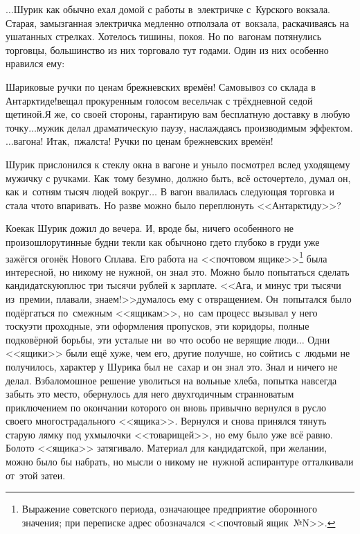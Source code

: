{%
	$\ldots$Шурик как обычно ехал домой с работы в~электричке с~Курского вокзала. Старая, замызганная электричка медленно отползала от~вокзала, раскачиваясь на ушатанных стрелках. Хотелось тишины, покоя. Но по~вагонам потянулись торговцы, большинство из них торговало тут годами. Один из них особенно нравился ему:
	
	\diagdash Шариковые ручки по ценам брежневских времён! Самовывоз со склада в Антарктиде!\mdash вещал прокуренным голосом весельчак с трёхдневной седой щетиной.\mdash Я же, со своей стороны, гарантирую вам бесплатную доставку в любую точку$\ldots$\mdash мужик делал драматическую паузу, наслаждаясь производимым эффектом.\mdash $\ldots$вагона! Итак,~пжалста! Ручки по ценам брежневских времён!%
	
	Шурик прислонился к стеклу окна в вагоне и уныло посмотрел вслед уходящему мужичку с ручками. Как~тому безумно, должно быть, всё осточертело, думал он, как и~сотням тысяч людей вокруг$\ldots$ В вагон ввалилась следующая торговка и стала что\sdash то впаривать. Но разве можно было переплюнуть <<Антарктиду>>? 
	
	Кое\sdash как Шурик дожил до вечера. И, вроде бы, ничего особенного не произошло\mdash рутинные будни текли как обычно\mdash но где\sdash то глубоко в груди уже зажёгся огонёк Нового Сплава. Его работа на <<почтовом ящике>>\footnote{Выражение советского периода, означающее предприятие оборонного значения; при переписке адрес обозначался <<почтовый ящик~№N>>.} была интересной, но никому не нужной, он знал это. Можно было попытаться сделать кандидатскую\mdash плюс три тысячи рублей к зарплате. <<Ага, и минус три тысячи из~премии, плавали, знаем!>>\mdash думалось ему с отвращением. Он~попытался было подёргаться по~смежным <<ящикам>>, но~сам процесс вызывал у него тоску\mdash эти проходные, эти оформления пропусков, эти коридоры, полные подковёрной борьбы, эти усталые ни~во что особо не верящие люди$\ldots$ Одни <<ящики>> были ещё хуже, чем его, другие получше, но сойтись с~людьми не получилось, характер у Шурика был не~сахар и он знал это. Знал и ничего не делал. Взбаломошное решение уволиться на вольные хлеба, попытка навсегда забыть это место, обернулось для него двухгодичным странноватым приключением по окончании которого он вновь привычно вернулся в русло своего многострадального <<ящика>>. Вернулся и снова принялся тянуть старую лямку под ухмылочки <<товарищей>>, но ему было уже всё равно. Болото <<ящика>> затягивало. Материал для кандидатской, при желании, можно было бы набрать, но мысли о никому не~нужной аспирантуре отталкивали от~этой затеи.%
	
}
